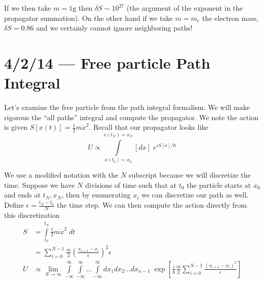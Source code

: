 \documentclass[10pt]{report}
\begin{document}
If we then take $m = 1\mathrm{g}$ then $\delta S \sim 10^{27}$ (the argument of the exponent in the propagator summation). On the other hand if we take $m = m_e$ the electron mass, $\delta S = 0.86$ and we certainly cannot ignore neighboring paths!

\chapter{4/2/14 --- Free particle Path Integral}

Let's examine the free particle from the path integral formalism. We will make rigorous the ``all paths'' integral and compute the propagator. We note the action is given $S[x(t)] = \frac{1}{2}m\dot{x}^2$. Recall that our propagator looks like
\begin{equation}
    U \propto \int\limits_{x(t_0) = x_0}^{x(t_N) = x_N}[dx]\;e^{iS[x]/\hbar}
\end{equation}

We use a modified notation with the $N$ subscript because we will discretize the time. Suppose we have $N$ divisions of time such that at $t_0$ the particle starts at $x_0$ and ends at $t_N, x_N$, then by enumerating $x_i$ we can discretize our path as well. Define $\epsilon = \frac{t_N - t_0}{N}$ the time step. We can then compute the action directly from this discretization
\begin{align}
    S &= \int\limits_{t_0}^{t_N}\frac{1}{2}m\dot{x}^2\;dt\\
    &= \sum_{i=0}^{N-1}  \frac{m}{2}\left( \frac{x_{i + 1} - x_i}{\epsilon} \right)^2\epsilon\\
    U &\propto \lim_{N \to \infty} \int\limits_{-\infty}^{\infty}\int\limits_{-\infty}^{\infty}\dots\int\limits_{-\infty}^{\infty}dx_1dx_2\dots dx_{n-1}\;\exp\left[ \frac{i}{\hbar}\frac{m}{2}\sum_{i=0}^{N-1}\frac{\left( x_{i + 1} - x_i \right)^2}{\epsilon} \right]
\end{align}
\end{document}
